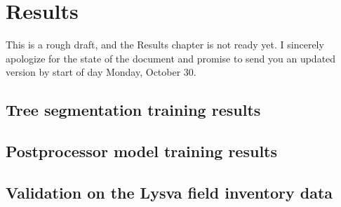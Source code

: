 \chapter{Results}\label{cap:results}

This is a rough draft, and the Results chapter is not ready yet. I sincerely apologize for the state of the document and promise to send you an updated version by start of day Monday, October 30.

\section{Tree segmentation training results}

\section{Postprocessor model training results}

\section{Validation on the Lysva field inventory data}

